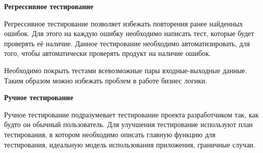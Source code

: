 \textbf{ Регрессивное тестирование } %

Регрессивное тестирование позволяет избежать повторения ранее найденных ошибок. Для этого на каждую ошибку необходимо написать тест, которые будет проверять её наличие. Данное тестирование необходимо автоматизировать, для того, чтобы автоматически проверять продукт на наличие ошибок.

Необходимо покрыть тестами всевозможные пары входные-выходные данные. Таким образом можно избежать проблем в работе бизнес логики.


\textbf{ Ручное тестирование } %

Ручное тестирование подразумевает тестирование проекта разработчиком так, как будто он обычный пользователь. Для улучшения тестирование используют план тестирования, в котором необходимо описать главную функцию для тестирования, идеальную модель использования приложения, граничные случаи.







 
 
 

 



































\clearpage



